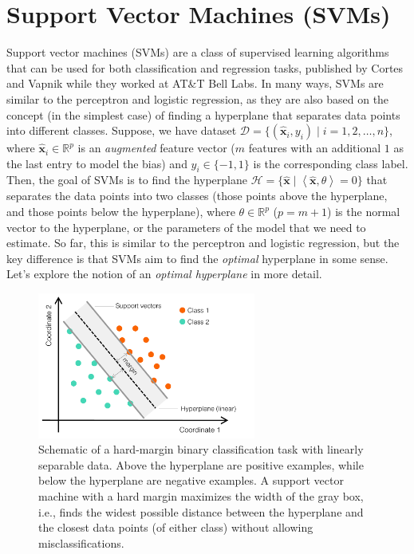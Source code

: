 \documentclass{article}[11pt]
\def\R{\mathbb{R}}
\begin{document}
\section{Support Vector Machines (SVMs)}\label{sec:svm}
Support vector machines (SVMs) are a class of supervised learning algorithms that can be used for both classification and regression tasks, 
published by Cortes and Vapnik \cite{Cortes:1995aa} while they worked at AT\&T Bell Labs.
In many ways, SVMs are similar to the perceptron and logistic regression, as they are also based on the concept (in the simplest case) of finding a hyperplane that separates data points into different classes.
Suppose, we have dataset $\mathcal{D} = \{(\hat{\mathbf{x}}_{i}, y_{i}) \mid i = 1,2,\dots,n\}$, where $\hat{\mathbf{x}}_i \in \R^p$ is an \textit{augmented} feature vector ($m$ features with an additional $1$ as the last entry to model the bias) and $y_i \in \{-1, 1\}$ is the corresponding class label.
Then, the goal of SVMs is to find the hyperplane $\mathcal{H} = \{\hat{\mathbf{x}} \mid \left<\hat{\mathbf{x}},\theta\right> = 0\}$ that separates the data points into two classes (those points above the hyperplane, and those points below the hyperplane), 
where $\theta \in \R^{p}$ ($p=m+1$) is the normal vector to the hyperplane, or the parameters of the model that we need to estimate.
So far, this is similar to the perceptron and logistic regression, but the key difference is that SVMs aim to find the \textit{optimal} hyperplane in some sense. 
Let's explore the notion of an \textit{optimal hyperplane} in more detail.


\begin{figure}
    \centering
	\includegraphics[width=0.64\textwidth]{./figs/Fig-SVM-Schematic.pdf}
	\caption{Schematic of a hard-margin binary classification task with linearly separable data.
    Above the hyperplane are positive examples, while below the hyperplane are negative examples.
    A support vector machine with a hard margin maximizes the width of the gray box, i.e., finds the widest possible
    distance between the hyperplane and the closest data points (of either class) without allowing misclassifications.}\label{fig:linearhyperplane-svm}
\end{figure}
\end{document}
